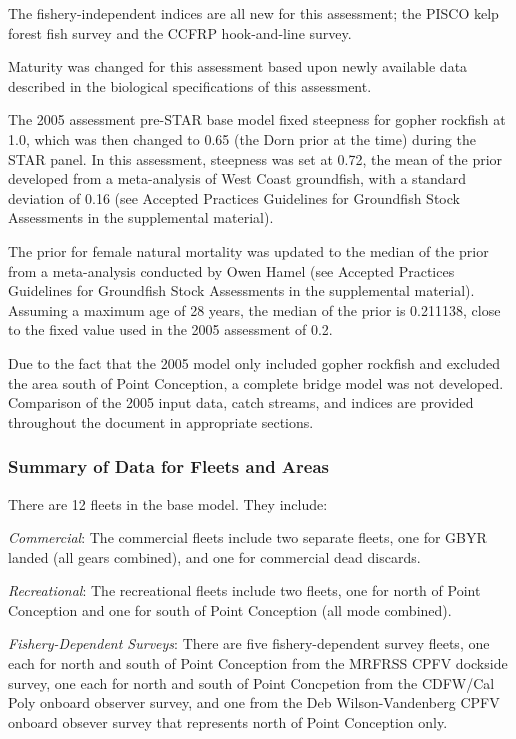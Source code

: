 \documentclass[12pt,]{article}
\begin{document}
The fishery-independent indices are all new for this assessment; the
PISCO kelp forest fish survey and the CCFRP hook-and-line survey.

Maturity was changed for this assessment based upon newly available data
described in the biological specifications of this assessment.

The 2005 assessment pre-STAR base model fixed steepness for gopher
rockfish at 1.0, which was then changed to 0.65 (the Dorn prior at the
time) during the STAR panel. In this assessment, steepness was set at
0.72, the mean of the prior developed from a meta-analysis of West Coast
groundfish, with a standard deviation of 0.16 (see Accepted Practices
Guidelines for Groundfish Stock Assessments in the supplemental
material).

The prior for female natural mortality was updated to the median of the
prior from a meta-analysis conducted by Owen Hamel (see Accepted
Practices Guidelines for Groundfish Stock Assessments in the
supplemental material). Assuming a maximum age of 28 years, the median
of the prior is 0.211138, close to the fixed value used in the 2005
assessment of 0.2.

Due to the fact that the 2005 model only included gopher rockfish and
excluded the area south of Point Conception, a complete bridge model was
not developed. Comparison of the 2005 input data, catch streams, and
indices are provided throughout the document in appropriate sections.

\subsubsection{Summary of Data for Fleets and
Areas}\label{summary-of-data-for-fleets-and-areas}

There are 12 fleets in the base model. They include:

\emph{Commercial}: The commercial fleets include two separate fleets,
one for GBYR landed (all gears combined), and one for commercial dead
discards.

\emph{Recreational}: The recreational fleets include two fleets, one for
north of Point Conception and one for south of Point Conception (all
mode combined).

\emph{Fishery-Dependent Surveys}: There are five fishery-dependent
survey fleets, one each for north and south of Point Conception from the
MRFRSS CPFV dockside survey, one each for north and south of Point
Concpetion from the CDFW/Cal Poly onboard observer survey, and one from
the Deb Wilson-Vandenberg CPFV onboard obsever survey that represents
north of Point Conception only.
\end{document}
